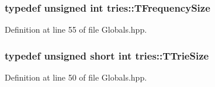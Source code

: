 \subsubsection[{T\+Frequency\+Size}]{\setlength{\rightskip}{0pt plus 5cm}typedef unsigned int {\bf tries\+::\+T\+Frequency\+Size}}\label{namespacetries_a3eaf32cf4423e228789e4387cd912d2a}


Definition at line 55 of file Globals.\+hpp.

\hypertarget{namespacetries_a621e8987880c3e13fa029a65336b920c}{}
\subsubsection[{T\+Trie\+Size}]{\setlength{\rightskip}{0pt plus 5cm}typedef unsigned short int {\bf tries\+::\+T\+Trie\+Size}}\label{namespacetries_a621e8987880c3e13fa029a65336b920c}


Definition at line 50 of file Globals.\+hpp.

